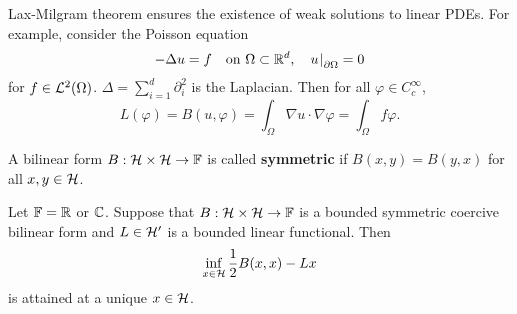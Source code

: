 \begin{remark}
    Lax-Milgram theorem ensures the existence of weak solutions to 
    linear PDEs. For example, consider the Poisson equation 
    \begin{equation*}
        -\Delta u = f \quad \text{on }\Omega\subset\mathbb{R}^d, \quad u\left.\hspace{-0.2em}\right|_{\partial\Omega} = 0
    \end{equation*}
    for $f\in\mathcal{L}^2(\Omega)$. $\Delta = \sum_{i=1}^{d}\partial_i^2$ is 
    the Laplacian. Then for all $\varphi\in C^\infty_c$, 
    \begin{equation*}
        L(\varphi) = B(u,\varphi) = \int_{\Omega} \nabla u\cdot\nabla\varphi = \int_{\Omega} f\varphi.
    \end{equation*} 
\end{remark}

\begin{definition}
    A bilinear form $B:\mathcal{H}\times\mathcal{H}\to\mathbb{F}$ is called \textbf{symmetric} 
    if $B(x,y) = B(y,x)$ for all $x,y\in\mathcal{H}$.
\end{definition}

\begin{theorem}
    Let $\mathbb{F} = \mathbb{R}$ or $\mathbb{C}$. Suppose that $B:\mathcal{H}\times\mathcal{H}\to\mathbb{F}$ is 
    a bounded symmetric coercive bilinear form and $L\in\mathcal{H}'$ is a bounded 
    linear functional. Then 
    \begin{equation*}
        \inf_{x\in\mathcal{H}} \frac{1}{2}B(x,x) - Lx
    \end{equation*}
    is attained at a unique $x\in\mathcal{H}$.
\end{theorem}